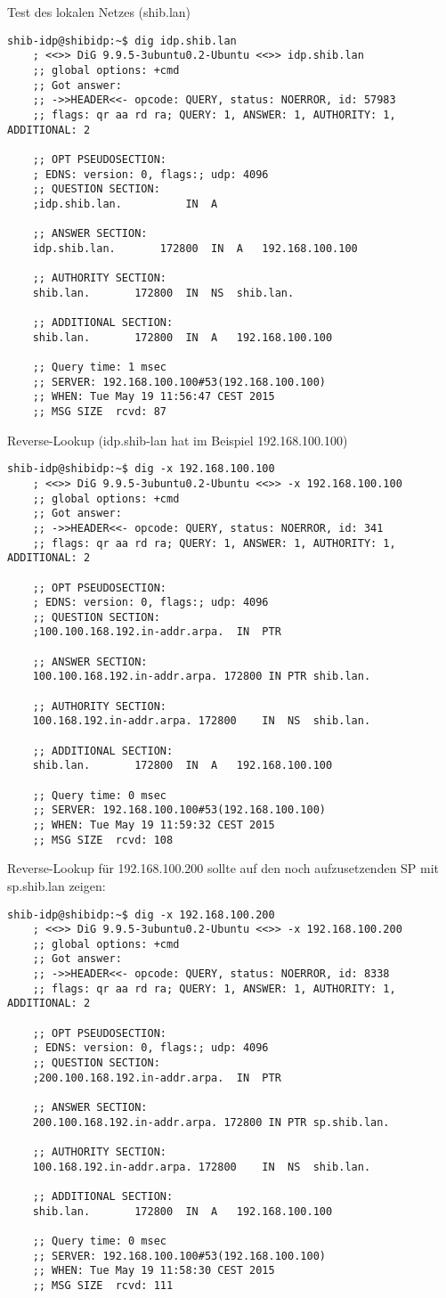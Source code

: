 Test des lokalen Netzes (shib.lan)
\begin{lstlisting}
shib-idp@shibidp:~$ dig idp.shib.lan
	; <<>> DiG 9.9.5-3ubuntu0.2-Ubuntu <<>> idp.shib.lan
	;; global options: +cmd
	;; Got answer:
	;; ->>HEADER<<- opcode: QUERY, status: NOERROR, id: 57983
	;; flags: qr aa rd ra; QUERY: 1, ANSWER: 1, AUTHORITY: 1, ADDITIONAL: 2

	;; OPT PSEUDOSECTION:
	; EDNS: version: 0, flags:; udp: 4096
	;; QUESTION SECTION:
	;idp.shib.lan.			IN	A

	;; ANSWER SECTION:
	idp.shib.lan.		172800	IN	A	192.168.100.100

	;; AUTHORITY SECTION:
	shib.lan.		172800	IN	NS	shib.lan.

	;; ADDITIONAL SECTION:
	shib.lan.		172800	IN	A	192.168.100.100

	;; Query time: 1 msec
	;; SERVER: 192.168.100.100#53(192.168.100.100)
	;; WHEN: Tue May 19 11:56:47 CEST 2015
	;; MSG SIZE  rcvd: 87
\end{lstlisting}
Reverse-Lookup (idp.shib-lan hat im Beispiel 192.168.100.100)
\begin{lstlisting}
shib-idp@shibidp:~$ dig -x 192.168.100.100
	; <<>> DiG 9.9.5-3ubuntu0.2-Ubuntu <<>> -x 192.168.100.100
	;; global options: +cmd
	;; Got answer:
	;; ->>HEADER<<- opcode: QUERY, status: NOERROR, id: 341
	;; flags: qr aa rd ra; QUERY: 1, ANSWER: 1, AUTHORITY: 1, ADDITIONAL: 2

	;; OPT PSEUDOSECTION:
	; EDNS: version: 0, flags:; udp: 4096
	;; QUESTION SECTION:
	;100.100.168.192.in-addr.arpa.	IN	PTR

	;; ANSWER SECTION:
	100.100.168.192.in-addr.arpa. 172800 IN	PTR	shib.lan.

	;; AUTHORITY SECTION:
	100.168.192.in-addr.arpa. 172800	IN	NS	shib.lan.

	;; ADDITIONAL SECTION:
	shib.lan.		172800	IN	A	192.168.100.100

	;; Query time: 0 msec
	;; SERVER: 192.168.100.100#53(192.168.100.100)
	;; WHEN: Tue May 19 11:59:32 CEST 2015
	;; MSG SIZE  rcvd: 108
\end{lstlisting}
Reverse-Lookup für 192.168.100.200 sollte auf den noch aufzusetzenden SP mit sp.shib.lan zeigen:
\begin{lstlisting}
shib-idp@shibidp:~$ dig -x 192.168.100.200
	; <<>> DiG 9.9.5-3ubuntu0.2-Ubuntu <<>> -x 192.168.100.200
	;; global options: +cmd
	;; Got answer:
	;; ->>HEADER<<- opcode: QUERY, status: NOERROR, id: 8338
	;; flags: qr aa rd ra; QUERY: 1, ANSWER: 1, AUTHORITY: 1, ADDITIONAL: 2

	;; OPT PSEUDOSECTION:
	; EDNS: version: 0, flags:; udp: 4096
	;; QUESTION SECTION:
	;200.100.168.192.in-addr.arpa.	IN	PTR

	;; ANSWER SECTION:
	200.100.168.192.in-addr.arpa. 172800 IN	PTR	sp.shib.lan.

	;; AUTHORITY SECTION:
	100.168.192.in-addr.arpa. 172800	IN	NS	shib.lan.

	;; ADDITIONAL SECTION:
	shib.lan.		172800	IN	A	192.168.100.100

	;; Query time: 0 msec
	;; SERVER: 192.168.100.100#53(192.168.100.100)
	;; WHEN: Tue May 19 11:58:30 CEST 2015
	;; MSG SIZE  rcvd: 111
\end{lstlisting}
